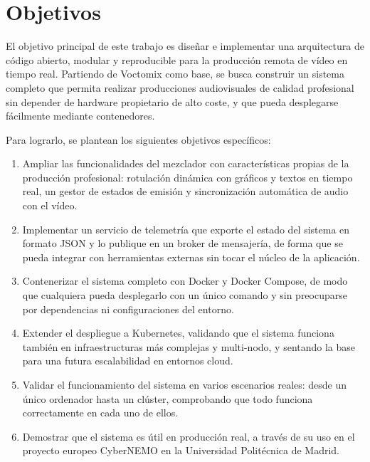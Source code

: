 \section{Objetivos}

El objetivo principal de este trabajo es diseñar e implementar una arquitectura de
código abierto, modular y reproducible para la producción remota de vídeo en tiempo real.
Partiendo de Voctomix como base, se busca construir un sistema completo que permita
realizar producciones audiovisuales de calidad profesional sin depender de hardware
propietario de alto coste, y que pueda desplegarse fácilmente mediante contenedores.

Para lograrlo, se plantean los siguientes objetivos específicos:

\begin{enumerate}
  \item Ampliar las funcionalidades del mezclador con características propias de la
        producción profesional: rotulación dinámica con gráficos y textos en tiempo real,
        un gestor de estados de emisión y sincronización automática de audio con el vídeo.

  \item Implementar un servicio de telemetría que exporte el estado del sistema en
        formato JSON y lo publique en un broker de mensajería, de forma que se pueda
        integrar con herramientas externas sin tocar el núcleo de la aplicación.

  \item Contenerizar el sistema completo con Docker y Docker Compose, de modo que
        cualquiera pueda desplegarlo con un único comando y sin preocuparse por
        dependencias ni configuraciones del entorno.

  \item Extender el despliegue a Kubernetes, validando que el sistema funciona también
        en infraestructuras más complejas y multi-nodo, y sentando la base para
        una futura escalabilidad en entornos cloud.

  \item Validar el funcionamiento del sistema en varios escenarios reales: desde un
        único ordenador hasta un clúster, comprobando que todo funciona correctamente
        en cada uno de ellos.

  \item Demostrar que el sistema es útil en producción real, a través de su uso en el
        proyecto europeo CyberNEMO en la Universidad Politécnica de Madrid.
\end{enumerate}

